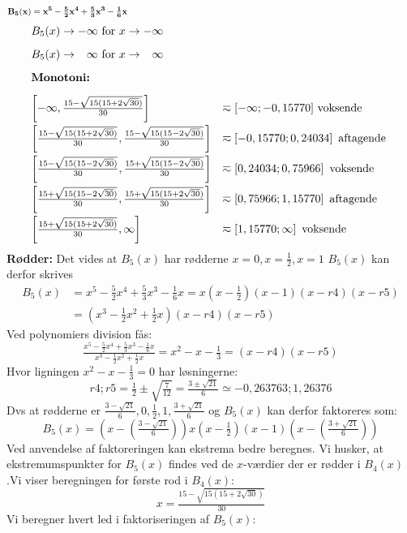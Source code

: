\[\mathbf{B_{5}(x)=x^{5}-\tfrac{5}{2}x^{4}+\tfrac{5}{3}x^{3}-\tfrac{1}{6}x} \MinLinie\]
\begin{equation*}
\begin{array}{ll}
			B_{5}(x) \rightarrow -\infty \text{ for } x \rightarrow -\infty \nylinie
			B_{5}(x) \rightarrow \phantom{-}\infty \text{ for } x \rightarrow \phantom{-}\infty \nylinie
\textbf{Monotoni:}	\nylinie 
			\left[-\infty,\tfrac{15 - \sqrt{15(15+2\sqrt{30})}}{30}\right] 						&\eqsim[-\infty;-0,15770] \text{ voksende } \nylinie
			\left[\tfrac{15 - \sqrt{15(15+2\sqrt{30})}}{30},\tfrac{15 - \sqrt{15(15-2\sqrt{30})}}{30}\right] 		&\eqsim\left[-0,15770;0,24034\right] \text{ aftagende } \nylinie
			\left[\tfrac{15 - \sqrt{15(15-2\sqrt{30})}}{30},\tfrac{15 + \sqrt{15(15-2\sqrt{30})}}{30}\right] 		&\eqsim\left[0,24034;0,75966\right] \text{ voksende } \nylinie
			\left[\tfrac{15 + \sqrt{15(15-2\sqrt{30})}}{30},\tfrac{15 + \sqrt{15(15+2\sqrt{30})}}{30}\right] 	&\eqsim\left[0,75966;1,15770\right] \text{ aftagende } \nylinie
			\left[\tfrac{15 + \sqrt{15(15+2\sqrt{30})}}{30},\infty\right] 						&\eqsim\left[1,15770;\infty\right] \text{ voksende }
\end{array}
\end{equation*}
\textbf{Rødder:}
Det vides at \(B_{5}(x)\) har rødderne \(x = 0, x = \tfrac{1}{2} , x = 1\)
\(B_{5}(x)\) kan derfor skrives  
\begin{align*}
B_{5}(x)&=x^{5}-\tfrac{5}{2}x^{4}+\tfrac{5}{3}x^{3}-\tfrac{1}{6}x
=x\left(x-\tfrac{1}{2}\right)\left(x-1\right)\left(x-r4\right)\left(x-r5\right)\\
&=\left(x^{3}-\tfrac{1}{2}x^{2}+\tfrac{1}{2}x\right)\left(x-r4\right)\left(x-r5\right)
\end{align*}
Ved polynomiers division fås:
\[\tfrac{x^{5}-\tfrac{5}{2}x^{4}+\tfrac{5}{3}x^{3}-\tfrac{1}{6}x}{ x^{3}-\tfrac{1}{2}x^{2}+\tfrac{1}{2}x }=x^{2}-x-\tfrac{1}{3}=(x-r4)(x-r5)\]
Hvor ligningen \(x^{2}-x-\tfrac{1}{3}=0\) har løsningerne:
\[r4;r5=\tfrac{1}{2} \pm \sqrt{\tfrac{7}{12}}= \tfrac{3 \pm \sqrt{21}}{6} \simeq -0,263763;1,26376\]
Dvs at rødderne er \(\tfrac{3-\sqrt{21}}{6},0,\tfrac{1}{2},1,\tfrac{3+\sqrt{21}}{6}\) og \(B_{5}(x)\) kan derfor faktoreres som:
\[B_{5}(x)=(x-(\tfrac{3-\sqrt{21}}{6}))x(x-\tfrac{1}{2})(x-1)(x-(\tfrac{3+\sqrt{21}}{6}))\]
Ved anvendelse af faktoreringen kan ekstrema bedre beregnes. Vi husker, at ekstremumspunkter for \(B_{5}(x)\) findes ved de \(x\)-værdier der er rødder i \(B_{4}(x)\).Vi viser beregningen for første rod i \(B_{4}(x)\):
\[x=\tfrac{15 - \sqrt{15(15+2\sqrt{30})}}{30}\]
Vi beregner hvert led i faktoriseringen af \(B_{5}(x)\):
